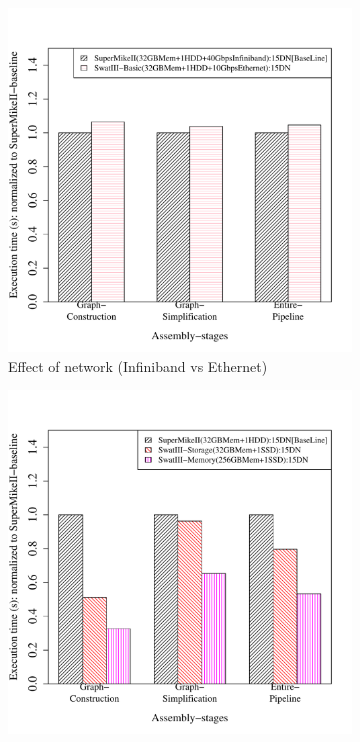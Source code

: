 \documentclass[conference]{IEEEtran}
\begin{document}
\begin{figure}[htb]
	\begin{subfigure}[b]{0.23\textwidth}
                \includegraphics[width=\textwidth]{Figure/PerormanceData/Plots/Network.pdf}
                \caption{Effect of network (Infiniband vs Ethernet)}
                \label{fig:SuperMikeSwatBasic}
        \end{subfigure}
 	\begin{subfigure}[b]{0.23\textwidth}
                \includegraphics[width=\textwidth]{Figure/PerormanceData/Plots/StorageMemory.pdf}

\end{subfigure}
\end{figure}
\end{document}
